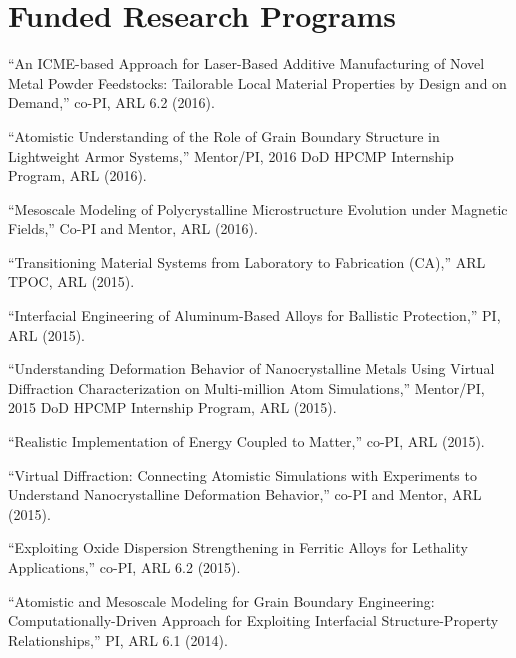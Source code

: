 \section{\sc Funded Research Programs}

\begin{list2}
\item ``An ICME-based Approach for Laser-Based Additive Manufacturing of Novel Metal Powder Feedstocks: Tailorable Local Material Properties by Design and on Demand,'' co-PI, ARL 6.2 (2016).
\item ``Atomistic Understanding of the Role of Grain Boundary Structure in Lightweight Armor Systems,'' Mentor/PI, 2016 DoD HPCMP Internship Program, ARL (2016).
\item ``Mesoscale Modeling of Polycrystalline Microstructure Evolution under Magnetic Fields,'' Co-PI and Mentor, ARL (2016).
\item ``Transitioning Material Systems from Laboratory to Fabrication (CA),'' ARL TPOC, ARL (2015).
\item ``Interfacial Engineering of Aluminum-Based Alloys for Ballistic Protection,'' PI, ARL (2015).
\item ``Understanding Deformation Behavior of Nanocrystalline Metals Using Virtual Diffraction Characterization on Multi-million Atom Simulations,'' Mentor/PI, 2015 DoD HPCMP Internship Program, ARL (2015).
\item ``Realistic Implementation of Energy Coupled to Matter,'' co-PI, ARL (2015).
\item ``Virtual Diffraction: Connecting Atomistic Simulations with Experiments to Understand Nanocrystalline Deformation Behavior,'' co-PI and Mentor, ARL (2015).
\item ``Exploiting Oxide Dispersion Strengthening in Ferritic Alloys for Lethality Applications,'' co-PI, ARL 6.2 (2015).
\item ``Atomistic and Mesoscale Modeling for Grain Boundary Engineering: Computationally-Driven Approach for Exploiting Interfacial Structure-Property Relationships,'' PI, ARL 6.1 (2014).

\end{list2}
